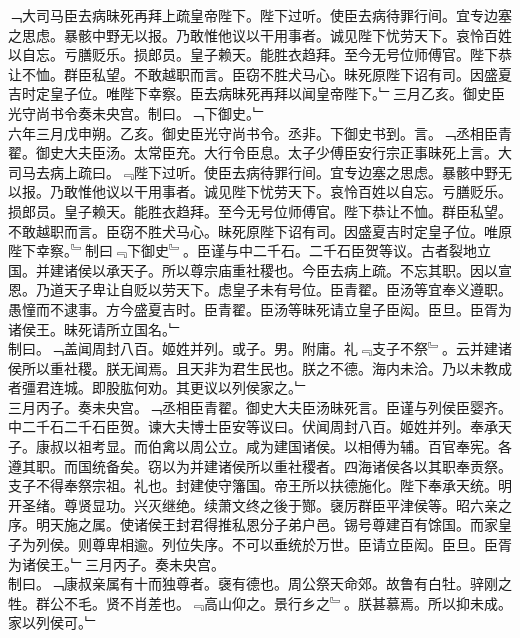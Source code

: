 \documentclass{zhvt-classic}
\begin{document}
\hspace*{2em}﹁大司马臣去病昧死再拜上疏皇帝陛下。陛下过听。使臣去病待罪行间。宜专边塞之思虑。暴骸中野无以报。乃敢惟他议以干用事者。诚见陛下忧劳天下。哀怜百姓以自忘。亏膳贬乐。损郎员。皇子赖天。能胜衣趋拜。至今无号位师傅官。陛下恭让不恤。群臣私望。不敢越职而言。臣窃不胜犬马心。昧死原陛下诏有司。因盛夏吉时定皇子位。唯陛下幸察。臣去病昧死再拜以闻皇帝陛下。﹂三月乙亥。御史臣光守尚书令奏未央宫。制曰。﹁下御史。﹂\\
\hspace*{2em}六年三月戊申朔。乙亥。御史臣光守尚书令。丞非。下御史书到。言。﹁丞相臣青翟。御史大夫臣汤。太常臣充。大行令臣息。太子少傅臣安行宗正事昧死上言。大司马去病上疏曰。﹃陛下过听。使臣去病待罪行间。宜专边塞之思虑。暴骸中野无以报。乃敢惟他议以干用事者。诚见陛下忧劳天下。哀怜百姓以自忘。亏膳贬乐。损郎员。皇子赖天。能胜衣趋拜。至今无号位师傅官。陛下恭让不恤。群臣私望。不敢越职而言。臣窃不胜犬马心。昧死原陛下诏有司。因盛夏吉时定皇子位。唯原陛下幸察。﹄制曰﹃下御史﹄。臣谨与中二千石。二千石臣贺等议。古者裂地立国。并建诸侯以承天子。所以尊宗庙重社稷也。今臣去病上疏。不忘其职。因以宣恩。乃道天子卑让自贬以劳天下。虑皇子未有号位。臣青翟。臣汤等宜奉义遵职。愚憧而不逮事。方今盛夏吉时。臣青翟。臣汤等昧死请立皇子臣闳。臣旦。臣胥为诸侯王。昧死请所立国名。﹂\\
\hspace*{2em}制曰。﹁盖闻周封八百。姬姓并列。或子。男。附庸。礼﹃支子不祭﹄。云并建诸侯所以重社稷。朕无闻焉。且天非为君生民也。朕之不德。海内未洽。乃以未教成者彊君连城。即股肱何劝。其更议以列侯家之。﹂\\
\hspace*{2em}三月丙子。奏未央宫。﹁丞相臣青翟。御史大夫臣汤昧死言。臣谨与列侯臣婴齐。中二千石二千石臣贺。谏大夫博士臣安等议曰。伏闻周封八百。姬姓并列。奉承天子。康叔以祖考显。而伯禽以周公立。咸为建国诸侯。以相傅为辅。百官奉宪。各遵其职。而国统备矣。窃以为并建诸侯所以重社稷者。四海诸侯各以其职奉贡祭。支子不得奉祭宗祖。礼也。封建使守籓国。帝王所以扶德施化。陛下奉承天统。明开圣绪。尊贤显功。兴灭继绝。续萧文终之後于酂。襃厉群臣平津侯等。昭六亲之序。明天施之属。使诸侯王封君得推私恩分子弟户邑。锡号尊建百有馀国。而家皇子为列侯。则尊卑相逾。列位失序。不可以垂统於万世。臣请立臣闳。臣旦。臣胥为诸侯王。﹂三月丙子。奏未央宫。\\
\hspace*{2em}制曰。﹁康叔亲属有十而独尊者。襃有德也。周公祭天命郊。故鲁有白牡。骍刚之牲。群公不毛。贤不肖差也。﹃高山仰之。景行乡之﹄。朕甚慕焉。所以抑未成。家以列侯可。﹂\\
\end{document}
